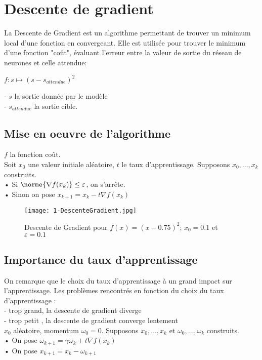 \section{Descente de gradient}

La Descente de Gradient est un algorithme permettant de trouver un minimum local d'une fonction en convergeant. Elle est utilisée pour trouver le minimum d'une fonction "coût", évaluant l'erreur entre la valeur de sortie du réseau de neurones et celle attendue: \\
\begin{center}
    $f : s \mapsto (s - s_{attendue})^2$\\
\end{center}
- $s$ la sortie donnée par le modèle \\
- $s_{attendue}$ la sortie cible. \\

\subsection*{Mise en oeuvre de l'algorithme}
$f$ la fonction coût. \\
Soit $x_0$ une valeur initiale aléatoire, $t$ le taux d'apprentissage.
Supposons $x_0, \ldots, x_k$ construits. \\
• Si $\norme{\nabla f(x_k)} \leq \varepsilon$, on s'arrête. \\
• Sinon on pose $x_{k+1} = x_k - t \nabla f(x_k)$ \\

\begin{figure}[htbp!]
    \centering
    \texttt{[image: 1-DescenteGradient.jpg]}
    \caption{Descente de Gradient pour $f(x) = (x-0.75)^2$; $x_0=0.1$ et $\varepsilon = 0.1$}
\end{figure}

\subsection*{Importance du taux d'apprentissage}
On remarque que le choix du taux d'apprentissage à un grand impact sur l'apprentissage. Les problèmes rencontrés en fonction du choix du taux d'apprentissage : \\
- trop grand, la descente de gradient diverge \\
- trop petit , la descente de gradient converge lentement \\

$x_0$ aléatoire, momentum $\omega_0 = 0$.
        Supposons $x_0, \ldots, x_k$ et $\omega_0, \ldots, \omega_k$ construits. \\
        • On pose $\omega_{k+1} = \gamma \omega_k + t \nabla f(x_k)$ \\
        • On pose $x_{k+1} = x_k - \omega_{k+1}$